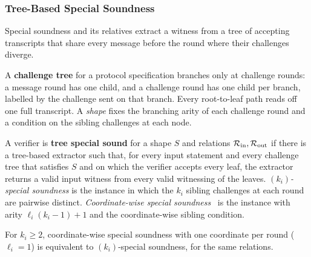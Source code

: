 \subsubsection{Tree-Based Special Soundness}\label{sec:tree_special_soundness}

Special soundness and its relatives extract a witness from a tree of accepting transcripts that
share every message before the round where their challenges diverge.

\begin{definition}
    \label{def:challenge_tree}
    A \textbf{challenge tree} for a protocol specification branches only at challenge rounds: a
    message round has one child, and a challenge round has one child per branch, labelled by the
    challenge sent on that branch. Every root-to-leaf path reads off one full transcript. A
    \emph{shape} fixes the branching arity of each challenge round and a condition on the sibling
    challenges at each node.
    \leanok
\end{definition}

\begin{definition}
    \label{def:tree_special_soundness}
    A verifier is \textbf{tree special sound} for a shape \(S\) and relations
    \(\mathcal{R}_{\mathrm{in}}, \mathcal{R}_{\mathrm{out}}\) if there is a tree-based extractor such that, for every input
    statement and every challenge tree that satisfies \(S\) and on which the verifier accepts every
    leaf, the extractor returns a valid input witness from every valid witnessing of the leaves.
    \emph{\((k_i)\)-special soundness} is the instance in which the \(k_i\) sibling challenges at
    each round are pairwise distinct. \emph{Coordinate-wise special soundness}~\cite{FMN24} is the
    instance with arity \(\ell_i(k_i - 1) + 1\) and the coordinate-wise sibling condition.
    \leanok
\end{definition}

\begin{theorem}
    \label{thm:cwss_of_special_sound_iff}
    For \(k_i \geq 2\), coordinate-wise special soundness with one coordinate per round (\(\ell_i = 1\))
    is equivalent to \((k_i)\)-special soundness, for the same relations.
    \leanok
\end{theorem}

